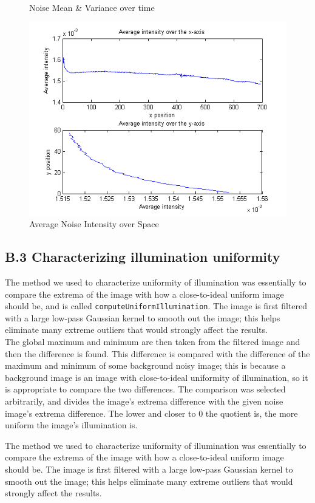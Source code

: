 \documentclass{article}
\begin{document}
\begin{figure}[b]
\begin{minipage}[b]{0.45\linewidth}
\caption{Noise Mean \& Variance over time}
\label{fig:noise_mean_var_time}
\end{minipage}
\end{figure}

\begin{figure}[t]
\centering
\includegraphics[width=0.45\linewidth]{figures/noise_intensity_over_space.png}
\caption{Average Noise Intensity over Space}
\label{fig:noise_intensity_space}
\end{figure}


\subsection*{B.3 Characterizing illumination uniformity}

The method we used to characterize uniformity of illumination was essentially to compare the extrema of
the image with how a close-to-ideal uniform image should be, and is called \texttt{computeUniformIllumination}.
The image is first filtered with a large low-pass Gaussian kernel
to smooth out the image; this helps eliminate many extreme outliers that would strongly affect the results.\\

The global maximum and minimum are then taken from the filtered image and then the difference is found.
This difference is compared with the difference of the maximum and minimum of some background noisy image;
this is because a background image is an image with close-to-ideal uniformity of illumination, so it is
appropriate to compare the two differences. The comparison was selected arbitrarily, and divides the
image's extrema difference with the given noise image's extrema difference. The lower and closer to 0
the quotient is, the more uniform the image's illumination is.

The method we used to characterize uniformity of illumination was essentially to compare the extrema of the image with how a close-to-ideal uniform image should be. The image is first filtered with a large low-pass Gaussian kernel to smooth out the image; this helps eliminate many extreme outliers that would strongly affect the results.
\end{document}
